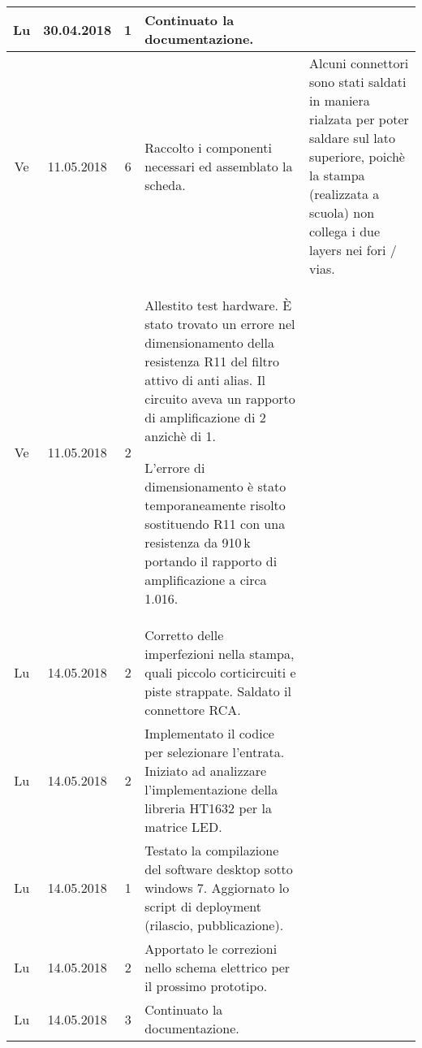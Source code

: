 \documentclass[a4paper]{article}
\newcommand{\journalentry}[5]{%
    #1 & #2 & #3 & #4 & #5 \\\hline
}
\begin{document}
\begin{tabularx}{\textwidth}{| c | c | c | p{} | X |}
        \journalentry{Lu}{30.04.2018}{1}{
            Continuato la documentazione.
        }{}

        \journalentry{Ve}{11.05.2018}{6}{
            Raccolto i componenti necessari ed assemblato la scheda.
        }{
            Alcuni connettori sono stati saldati in maniera rialzata per poter 
            saldare sul lato superiore, poich\`e la stampa (realizzata a scuola)
            non collega i due layers nei fori / vias.
        }

        \journalentry{Ve}{11.05.2018}{2}{
            Allestito test hardware.
            \`E stato trovato un errore nel dimensionamento della resistenza 
            R11 del filtro attivo di anti alias. Il circuito aveva un rapporto
            di amplificazione di 2 anzich\`e di 1.

            L'errore di dimensionamento \`e stato temporaneamente risolto 
            sostituendo R11 con una resistenza da 910\,k portando il rapporto
            di amplificazione a circa 1.016.
        }{
        }

        \journalentry{Lu}{14.05.2018}{2}{
            Corretto delle imperfezioni nella stampa, quali piccolo corticircuiti
            e piste strappate. Saldato il connettore RCA.
        }{}

        \journalentry{Lu}{14.05.2018}{2}{
            Implementato il codice per selezionare l'entrata.
            Iniziato ad analizzare l'implementazione della libreria HT1632 per
            la matrice LED.
        }{}

        \journalentry{Lu}{14.05.2018}{1}{
            Testato la compilazione del software desktop sotto windows 7.
            Aggiornato lo script di deployment (rilascio, pubblicazione).
        }{}

        \journalentry{Lu}{14.05.2018}{2}{
            Apportato le correzioni nello schema elettrico per il prossimo
            prototipo.
        }{}

        \journalentry{Lu}{14.05.2018}{3}{
            Continuato la documentazione.
        }{}

    \end{tabularx}
\end{document}
